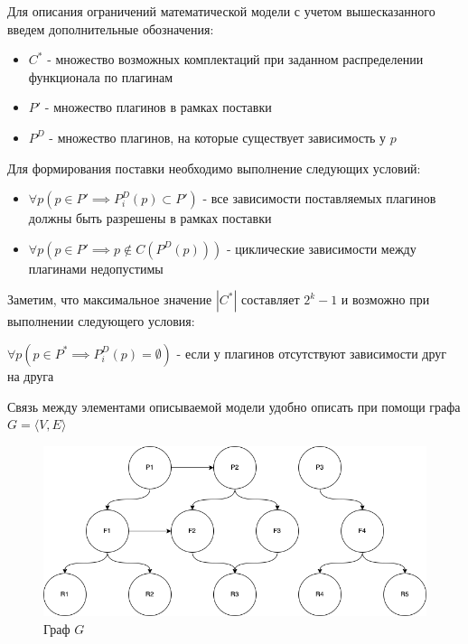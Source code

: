 \documentclass{article}
\begin{document}
  Для описания ограничений математической модели с учетом вышесказанного введем дополнительные обозначения:

  \begin{itemize}
    \item $C^*$ - множество возможных комплектаций при заданном распределении функционала по плагинам
    \item $P'$ - множество плагинов в рамках поставки
    \item $P^D$ - множество плагинов, на которые существует зависимость у $p$
  \end{itemize}

  Для формирования поставки необходимо выполнение следующих условий:
  \begin{itemize}
    \item $\forall p (p \in P' \implies P^D_i(p) \subset P')$ - все зависимости поставляемых плагинов должны быть разрешены в рамках поставки
    \item $\forall p (p \in P' \implies p \not \in C(P^D(p)))$ - циклические зависимости между плагинами недопустимы
  \end{itemize}

  Заметим, что максимальное значение $|C^*|$ составляет $2^k - 1$ и возможно при выполнении следующего условия:
  
  $\forall p (p \in P^* \implies P^D_i(p) = \emptyset)$ - если у плагинов отсутствуют зависимости друг на друга
  
  Связь между элементами описываемой модели удобно описать при помощи графа $G = \langle V, E \rangle$

  \begin{figure}[H]
      \centering
      \includegraphics[width=1\textwidth]{Исходный граф.drawio}
      \caption{Граф $G$}
  \end{figure}
  
\end{document}
